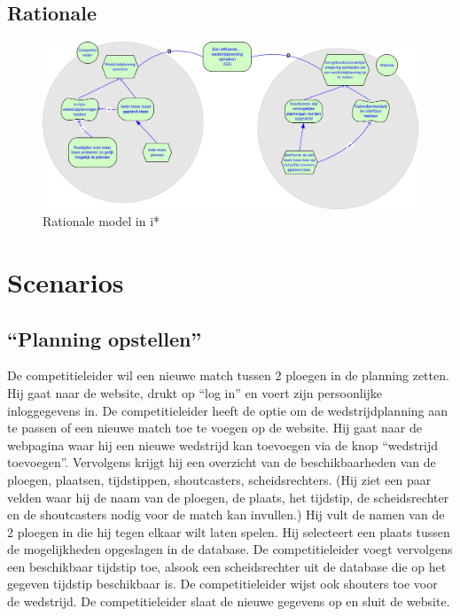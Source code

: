 \documentclass[12pt,a4paper]{article}
\begin{document}
			\subsection{Rationale}
			\begin{figure}[H]
				\includegraphics[width=\textwidth]{../2-Doelen/istar4.png}
				\caption{Rationale model in i*}
			\end{figure}
		\section{Scenarios}
			\subsection{``Planning opstellen''}
			De competitieleider wil een nieuwe match tussen 2 ploegen in de planning zetten. Hij gaat naar de website, drukt op “log in” en voert zijn persoonlijke inloggegevens in. De competitieleider heeft de optie om de wedstrijdplanning aan te passen of een nieuwe match toe te voegen op de website. Hij gaat naar de webpagina waar hij een nieuwe wedstrijd kan toevoegen via de knop “wedstrijd toevoegen”. Vervolgens krijgt hij een overzicht van de beschikbaarheden van de ploegen, plaatsen, tijdstippen, shoutcasters, scheidsrechters. (Hij ziet een paar velden waar hij de naam van de ploegen, de plaats, het tijdstip, de scheidsrechter en de shoutcasters nodig voor de match kan invullen.) Hij vult de namen van de 2 ploegen in die hij tegen elkaar wilt laten spelen. Hij selecteert een plaats tussen de mogelijkheden opgeslagen in de database. De competitieleider voegt vervolgens een beschikbaar tijdstip toe, alsook een scheidsrechter uit de database die op het gegeven tijdstip beschikbaar is. De competitieleider wijst ook shouters toe voor de wedstrijd. De competitieleider slaat de nieuwe gegevens op en sluit de website.
			\newpage
\end{document}

